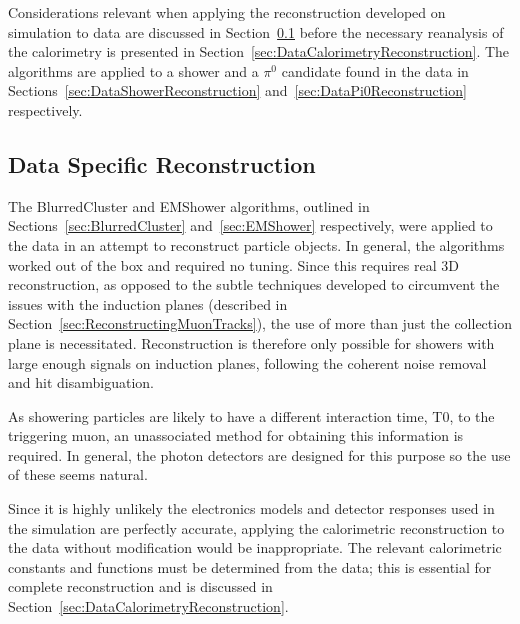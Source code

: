 Considerations relevant when applying the reconstruction developed on simulation to data are discussed in Section~\ref{sec:DataSpecificReconstruction} before the necessary reanalysis of the calorimetry is presented in Section~\ref{sec:DataCalorimetryReconstruction}.  The algorithms are applied to a shower and a $\pi^0$ candidate found in the data in Sections~\ref{sec:DataShowerReconstruction} and~\ref{sec:DataPi0Reconstruction} respectively.

\subsection{Data Specific Reconstruction}\label{sec:DataSpecificReconstruction}

The BlurredCluster and EMShower algorithms, outlined in Sections~\ref{sec:BlurredCluster} and~\ref{sec:EMShower} respectively, were applied to the data in an attempt to reconstruct particle objects.  In general, the algorithms worked out of the box and required no tuning.  Since this requires real 3D reconstruction, as opposed to the subtle techniques developed to circumvent the issues with the induction planes (described in Section~\ref{sec:ReconstructingMuonTracks}), the use of more than just the collection plane is necessitated.  Reconstruction is therefore only possible for showers with large enough signals on induction planes, following the coherent noise removal and hit disambiguation.

As showering particles are likely to have a different interaction time, T0, to the triggering muon, an unassociated method for obtaining this information is required.  In general, the photon detectors are designed for this purpose so the use of these seems natural.

Since it is highly unlikely the electronics models and detector responses used in the simulation are perfectly accurate, applying the calorimetric reconstruction to the data without modification would be inappropriate.  The relevant calorimetric constants and functions must be determined from the data; this is essential for complete reconstruction and is discussed in Section~\ref{sec:DataCalorimetryReconstruction}.

